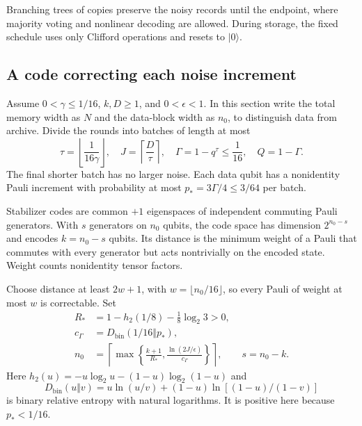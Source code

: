 \documentclass[11pt,a4paper]{article}
\numberwithin{equation}{section}
\theoremstyle{remark}\newtheorem*{remark}{Interpretation}
\newcommand{\eps}{\epsilon}
\newcommand{\ket}[1]{\lvert#1\rangle}
\begin{document}
Branching trees of copies preserve the noisy records until the endpoint, where majority voting and nonlinear decoding are allowed. During storage, the fixed schedule uses only Clifford operations and resets to $\ket0$.

\subsection{A code correcting each noise increment}
Assume $0<\gamma\le1/16$, $k,D\ge1$, and $0<\eps<1$. In this section write the total memory width as $N$ and the data-block width as $n_0$, to distinguish data from archive. Divide the rounds into batches of length at most
\begin{equation}
\tau=\left\lfloor\frac1{16\gamma}\right\rfloor,
\quad J=\left\lceil\frac D\tau\right\rceil,
\quad \Gamma=1-q^\tau\le\frac1{16},
\quad Q=1-\Gamma.
\end{equation}
The final shorter batch has no larger noise. Each data qubit has a nonidentity Pauli increment with probability at most $p_*=3\Gamma/4\le3/64$ per batch.

Stabilizer codes are common $+1$ eigenspaces of independent commuting Pauli generators. With $s$ generators on $n_0$ qubits, the code space has dimension $2^{n_0-s}$ and encodes $k=n_0-s$ qubits. Its distance is the minimum weight of a Pauli that commutes with every generator but acts nontrivially on the encoded state. Weight counts nonidentity tensor factors.

Choose distance at least $2w+1$, with $w=\lfloor n_0/16\rfloor$, so every Pauli of weight at most $w$ is correctable. Set
\begin{align}
R_*&=1-h_2(1/8)-\tfrac18\log_2 3>0,\\
c_\Gamma&=D_{\mathrm{bin}}(1/16\Vert p_*),\\
n_0&=\left\lceil\max\left\{
\frac{k+1}{R_*},\frac{\ln(2J/\eps)}{c_\Gamma}\right\}\right\rceil,
\qquad s=n_0-k.
\label{eq:datawidth}
\end{align}
Here $h_2(u)=-u\log_2u-(1-u)\log_2(1-u)$ and
\begin{equation}
D_{\mathrm{bin}}(u\Vert v)
=u\ln(u/v)+(1-u)\ln[(1-u)/(1-v)]
\end{equation}
is binary relative entropy with natural logarithms. It is positive here because $p_*<1/16$.
\end{document}
